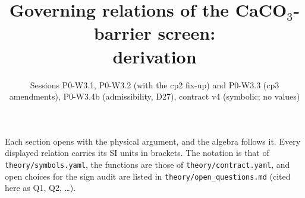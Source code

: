 \documentclass[11pt]{article}
\title{Governing relations of the CaCO$_3$-barrier screen:\\ derivation}
\author{}
\date{Sessions P0-W3.1, P0-W3.2 (with the cp2 fix-up) and P0-W3.3 (cp3 amendments), P0-W3.4b (admissibility, D27), contract v4 (symbolic; no values)}
\begin{document}
\maketitle
\noindent Each section opens with the physical argument, and the algebra follows it. Every displayed
relation carries its SI units in brackets. The notation is that of \texttt{theory/symbols.yaml}, the
functions are those of \texttt{theory/contract.yaml}, and open choices for the sign audit are listed in
\texttt{theory/open\_questions.md} (cited here as Q1, Q2, \dots).

\end{document}

